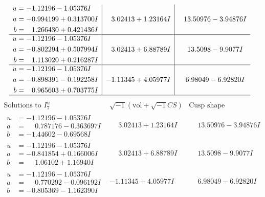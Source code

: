 \documentclass[1p]{elsarticle_modified}
\theoremstyle{definition}
\newcommand{\I}{\sqrt{-1}}
\begin{document}
$$\begin{array}{c|c|c}
\begin{aligned}
u &= -1.12196 - 1.05376 I \\
a &= -0.994199 + 0.313700 I \\
b &= \phantom{-}1.266430 + 0.421436 I\end{aligned}
 & \phantom{-}3.02413 + 1.23164 I & \phantom{-}13.50976 - 3.94876 I \\ \hline\begin{aligned}
u &= -1.12196 - 1.05376 I \\
a &= -0.802294 + 0.507994 I \\
b &= \phantom{-}1.113020 + 0.216287 I\end{aligned}
 & \phantom{-}3.02413 + 6.88789 I & \phantom{-}13.5098 - 9.9077 I \\ \hline\begin{aligned}
u &= -1.12196 - 1.05376 I \\
a &= -0.898391 - 0.192258 I \\
b &= \phantom{-}0.965603 + 0.703775 I\end{aligned}
 & -1.11345 + 4.05977 I & \phantom{-}6.98049 - 6.92820 I\\
 \hline 
 \end{array}$$\newpage$$\begin{array}{c|c|c}  
\text{Solutions to }I^u_{7}& \I (\text{vol} + \sqrt{-1}CS) & \text{Cusp shape}\\
 \hline 
\begin{aligned}
u &= -1.12196 - 1.05376 I \\
a &= \phantom{-}0.787176 - 0.363697 I \\
b &= -1.44602 - 0.69568 I\end{aligned}
 & \phantom{-}3.02413 + 1.23164 I & \phantom{-}13.50976 - 3.94876 I \\ \hline\begin{aligned}
u &= -1.12196 - 1.05376 I \\
a &= -0.841854 + 0.166006 I \\
b &= \phantom{-}1.06102 + 1.16940 I\end{aligned}
 & \phantom{-}3.02413 + 6.88789 I & \phantom{-}13.5098 - 9.9077 I \\ \hline\begin{aligned}
u &= -1.12196 - 1.05376 I \\
a &= \phantom{-}0.770292 - 0.096192 I \\
b &= -0.805369 - 1.162390 I\end{aligned}
 & -1.11345 + 4.05977 I & \phantom{-}6.98049 - 6.92820 I \\ \hline\begin{aligned}

\end{aligned}
\end{array}$$
\end{document}
